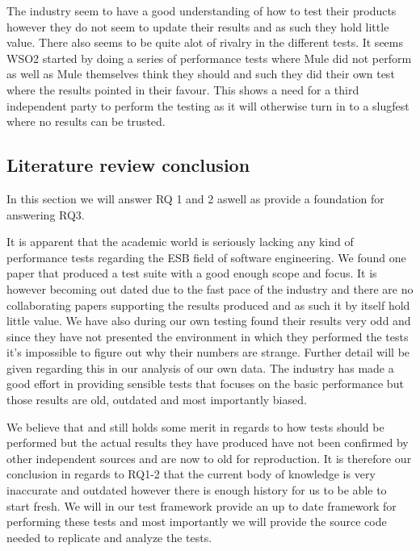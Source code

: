 The industry seem to have a good understanding of how to test their products however they do not seem to update their results and as such they hold little value.
There also seems to be quite alot of rivalry in the different tests. 
It seems WSO2 started by doing a series of performance tests where Mule did not perform as well as Mule themselves think they should and such they did their own test where the results pointed in their favour.
This shows a need for a third independent party to perform the testing as it will otherwise turn in to a slugfest where no results can be trusted. 

\subsection{Literature review conclusion}
In this section we will answer RQ 1 and 2 aswell as provide a foundation for answering RQ3.

It is apparent that the academic world is seriously lacking any kind of performance tests regarding the ESB field of software engineering. 
We found one paper\cite{Sanjay2011} that produced a test suite with a good enough scope and focus. 
It is however becoming out dated due to the fast pace of the industry and there are no collaborating papers supporting the results produced and as such it by itself hold little value. 
We have also during our own testing found their results very odd and since they have not presented the environment in which they performed the tests it's impossible to figure out why their numbers are strange. 
Further detail will be given regarding this in our analysis of our own data. %
The industry has made a good effort in providing sensible tests that focuses on the basic performance but those results are old, outdated and most importantly biased. 

We believe that \cite{Sanjay2011} and \cite{Perera07,Perera07R2,Perera07R3,mulesoft08}still holds some merit in regards to how tests should be performed but the actual results they have produced have not been confirmed by other independent sources and are now to old for reproduction. 
It is therefore our conclusion in regards to RQ1-2 that the current body of knowledge is very inaccurate and outdated however there is enough history for us to be able to start fresh.
We will in our test framework provide an up to date framework for performing these tests and most importantly we will provide the source code needed to replicate and analyze the tests.
